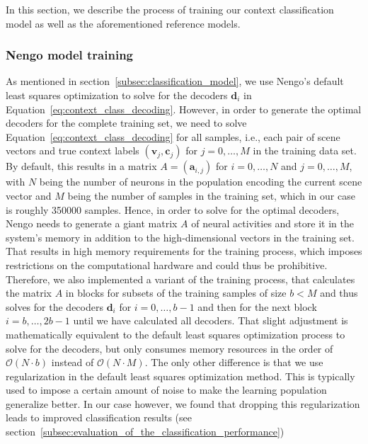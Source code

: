 In this section, we describe the process of training our context classification model as well as the aforementioned reference models.

\subsubsection{Nengo model training}%
\label{ssubsec:nengo_model_training}

As mentioned in section~\ref{subsec:classification_model}, we use \ac{Nengo}'s default least squares optimization to solve for the decoders $ \mathbf{d}_{i}$ in Equation~\eqref{eq:context_class_decoding}.
However, in order to generate the optimal decoders for the complete training set, we need to solve Equation~\eqref{eq:context_class_decoding} for all samples, i.e., each pair of scene vectors and true context labels  $ \left( \mathbf{v}_{j}, \mathbf{c}_j\right)$ for $j=0, \ldots, M$ in the training data set.
By default, this results in a matrix $A = \left( \mathbf{a}_{i,j}\right)$ for $i=0, \ldots, N$ and $j=0, \ldots, M$, with $N$ being the number of neurons in the population encoding the current scene vector and $M$ being the number of samples in the training set, which in our case is roughly \num{350000} samples.
Hence, in order to solve for the optimal decoders, \ac{Nengo} needs to generate a giant matrix $A$ of neural activities and store it in the system's memory in addition to the high-dimensional vectors in the training set.
That results in high memory requirements for the training process, which imposes restrictions on the computational hardware and could thus be prohibitive.
Therefore, we also implemented a variant of the training process, that calculates the matrix $A$ in blocks for subsets of the training samples of size $b < M$ and thus solves for the decoders $ \mathbf{d}_{i}$ for $i=0, \ldots, b-1$ and then for the next block $i=b, \ldots, 2b-1$ until we have calculated all decoders.
That slight adjustment is mathematically equivalent to the default least squares optimization process to solve for the decoders, but only consumes memory resources in the order of $ \mathcal{O}\left(N\cdot b\right)$ instead of $ \mathcal{O}\left(N \cdot M\right)$.
The only other difference is that we use regularization in the default least squares optimization method.
This is typically used to impose a certain amount of noise to make the learning population generalize better.
In our case however, we found that dropping this regularization leads to improved classification results (see section~\ref{subsec:evaluation_of_the_classification_performance})

